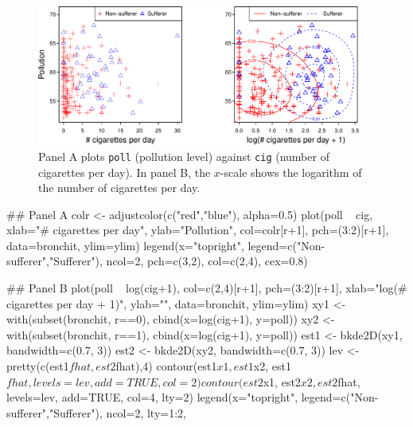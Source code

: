 \documentclass{tufte-book}\usepackage[]{graphicx}\usepackage[]{color}
\newcommand{\txtt}[1]{\texttt{#1}}
\begin{document}
\begin{figure}
\begin{Schunk}


\centerline{\includegraphics[width=0.95\textwidth]{figs/8-bronchitAB-1} }

\end{Schunk}
\caption{Panel A plots \txtt{poll} (pollution level) against
  \txtt{cig} (number of cigarettes per day).  In panel B, the
  $x$-scale shows the logarithm of the number of cigarettes per
  day.\label{fig:cig-poll}}
\vspace*{12pt}
\end{figure}

\begin{Schunk}
\begin{Sinput}
## Panel A
colr <- adjustcolor(c("red","blue"), alpha=0.5)
plot(poll ~ cig,
     xlab="# cigarettes per day", ylab="Pollution",
     col=colr[r+1], pch=(3:2)[r+1], data=bronchit,
     ylim=ylim)
legend(x="topright",
       legend=c("Non-sufferer","Sufferer"),
       ncol=2, pch=c(3,2), col=c(2,4), cex=0.8)
\end{Sinput}
\end{Schunk}


\begin{fullwidth}
\begin{Schunk}
\begin{Sinput}
## Panel B
plot(poll ~ log(cig+1), col=c(2,4)[r+1], pch=(3:2)[r+1],
     xlab="log(# cigarettes per day + 1)", ylab="", data=bronchit, ylim=ylim)
xy1 <- with(subset(bronchit, r==0), cbind(x=log(cig+1), y=poll))
xy2 <- with(subset(bronchit, r==1), cbind(x=log(cig+1), y=poll))
est1 <- bkde2D(xy1, bandwidth=c(0.7, 3))
est2 <- bkde2D(xy2, bandwidth=c(0.7, 3))
lev <- pretty(c(est1$fhat, est2$fhat),4)
contour(est1$x1, est1$x2, est1$fhat, levels=lev, add=TRUE, col=2)
contour(est2$x1, est2$x2, est2$fhat, levels=lev, add=TRUE, col=4, lty=2)
legend(x="topright", legend=c("Non-sufferer","Sufferer"), ncol=2, lty=1:2,
\end{Sinput}
\end{Schunk}
\end{fullwidth}
\end{document}
